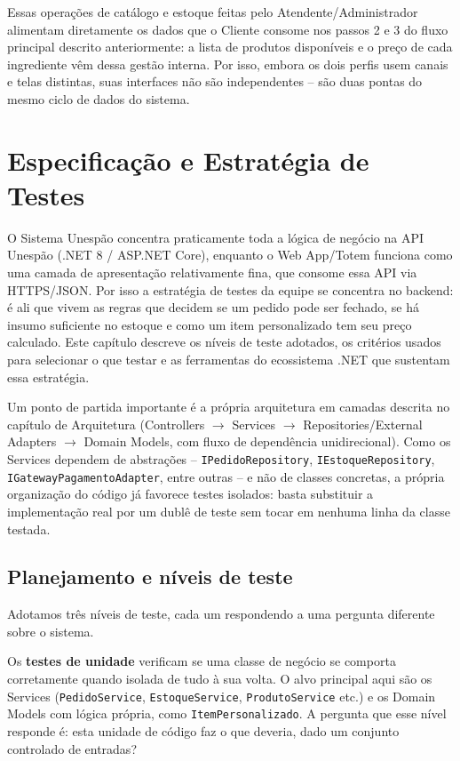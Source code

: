 \documentclass[a4paper,12pt,oneside,openany]{book}
\begin{document}
Essas operações de catálogo e estoque feitas pelo Atendente/Administrador alimentam diretamente os dados que o Cliente consome nos passos 2 e 3 do fluxo principal descrito anteriormente: a lista de produtos disponíveis e o preço de cada ingrediente vêm dessa gestão interna. Por isso, embora os dois perfis usem canais e telas distintas, suas interfaces não são independentes -- são duas pontas do mesmo ciclo de dados do sistema.

\chapter{Especificação e Estratégia de Testes}

O Sistema Unespão concentra praticamente toda a lógica de negócio na API Unespão (.NET 8 / ASP.NET Core), enquanto o Web App/Totem funciona como uma camada de apresentação relativamente fina, que consome essa API via HTTPS/JSON. Por isso a estratégia de testes da equipe se concentra no backend: é ali que vivem as regras que decidem se um pedido pode ser fechado, se há insumo suficiente no estoque e como um item personalizado tem seu preço calculado. Este capítulo descreve os níveis de teste adotados, os critérios usados para selecionar o que testar e as ferramentas do ecossistema .NET que sustentam essa estratégia.

Um ponto de partida importante é a própria arquitetura em camadas descrita no capítulo de Arquitetura (Controllers $\rightarrow$ Services $\rightarrow$ Repositories/External Adapters $\rightarrow$ Domain Models, com fluxo de dependência unidirecional). Como os Services dependem de abstrações -- \texttt{IPedidoRepository}, \texttt{IEstoqueRepository}, \texttt{IGatewayPagamentoAdapter}, entre outras -- e não de classes concretas, a própria organização do código já favorece testes isolados: basta substituir a implementação real por um dublê de teste sem tocar em nenhuma linha da classe testada.

\section{Planejamento e níveis de teste}

Adotamos três níveis de teste, cada um respondendo a uma pergunta diferente sobre o sistema.

Os \textbf{testes de unidade} verificam se uma classe de negócio se comporta corretamente quando isolada de tudo à sua volta. O alvo principal aqui são os Services (\texttt{PedidoService}, \texttt{EstoqueService}, \texttt{ProdutoService} etc.) e os Domain Models com lógica própria, como \texttt{ItemPersonalizado}. A pergunta que esse nível responde é: esta unidade de código faz o que deveria, dado um conjunto controlado de entradas?
\end{document}
